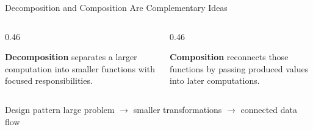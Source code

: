 \documentclass[aspectratio=169,10pt]{beamer}
\begin{document}

\begin{frame}{Decomposition and Composition Are Complementary Ideas}
  \begin{columns}[T,onlytextwidth]
    \begin{column}{0.46\textwidth}
      \begin{cpdefinition}
        \textbf{Decomposition} separates a larger computation into smaller functions with focused responsibilities.
      \end{cpdefinition}
    \end{column}

    \begin{column}{0.46\textwidth}
      \begin{cpdefinition}
        \textbf{Composition} reconnects those functions by passing produced values into later computations.
      \end{cpdefinition}
    \end{column}
  \end{columns}

  \begin{block}{Design pattern}
    \centering
    large problem $\rightarrow$ smaller transformations $\rightarrow$ connected data flow
  \end{block}
\end{frame}
\end{document}
